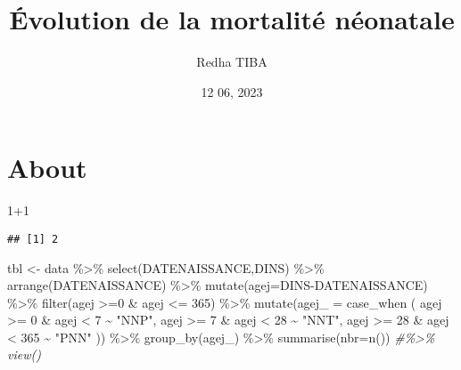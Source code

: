 \documentclass[
]{book}
\title{Évolution de la mortalité néonatale}
\author{Redha TIBA}
\date{12 06, 2023}
\newenvironment{Shaded}{\begin{snugshade}}{\end{snugshade}}
\newcommand{\AttributeTok}[1]{\textcolor[rgb]{0.77,0.63,0.00}{#1}}
\newcommand{\CommentTok}[1]{\textcolor[rgb]{0.56,0.35,0.01}{\textit{#1}}}
\newcommand{\DecValTok}[1]{\textcolor[rgb]{0.00,0.00,0.81}{#1}}
\newcommand{\FunctionTok}[1]{\textcolor[rgb]{0.00,0.00,0.00}{#1}}
\newcommand{\NormalTok}[1]{#1}
\newcommand{\OtherTok}[1]{\textcolor[rgb]{0.56,0.35,0.01}{#1}}
\newcommand{\SpecialCharTok}[1]{\textcolor[rgb]{0.00,0.00,0.00}{#1}}
\newcommand{\StringTok}[1]{\textcolor[rgb]{0.31,0.60,0.02}{#1}}
\begin{document}
\maketitle

{
\setcounter{tocdepth}{1}
\tableofcontents
}
\hypertarget{about}{%
\chapter{About}\label{about}}

\begin{Shaded}
\begin{Highlighting}[]
\DecValTok{1}\SpecialCharTok{+}\DecValTok{1}
\end{Highlighting}
\end{Shaded}

\begin{verbatim}
## [1] 2
\end{verbatim}

\begin{Shaded}
\begin{Highlighting}[]
\NormalTok{tbl }\OtherTok{\textless{}{-}}\NormalTok{ data }\SpecialCharTok{\%\textgreater{}\%}
  \FunctionTok{select}\NormalTok{(DATENAISSANCE,DINS) }\SpecialCharTok{\%\textgreater{}\%} 
  \FunctionTok{arrange}\NormalTok{(DATENAISSANCE) }\SpecialCharTok{\%\textgreater{}\%} 
  \FunctionTok{mutate}\NormalTok{(}\AttributeTok{agej=}\NormalTok{DINS}\SpecialCharTok{{-}}\NormalTok{DATENAISSANCE) }\SpecialCharTok{\%\textgreater{}\%} 
  \FunctionTok{filter}\NormalTok{(agej }\SpecialCharTok{\textgreater{}=}\DecValTok{0} \SpecialCharTok{\&}\NormalTok{ agej }\SpecialCharTok{\textless{}=} \DecValTok{365}\NormalTok{) }\SpecialCharTok{\%\textgreater{}\%} 
  \FunctionTok{mutate}\NormalTok{(}\AttributeTok{agej\_ =}
\NormalTok{           case\_when}
\NormalTok{            (}
\NormalTok{             agej }\SpecialCharTok{\textgreater{}=} \DecValTok{0} \SpecialCharTok{\&}\NormalTok{ agej }\SpecialCharTok{\textless{}} \DecValTok{7} \SpecialCharTok{\textasciitilde{}} \StringTok{"NNP"}\NormalTok{,}
\NormalTok{             agej }\SpecialCharTok{\textgreater{}=} \DecValTok{7} \SpecialCharTok{\&}\NormalTok{ agej }\SpecialCharTok{\textless{}} \DecValTok{28} \SpecialCharTok{\textasciitilde{}} \StringTok{"NNT"}\NormalTok{,}
\NormalTok{             agej }\SpecialCharTok{\textgreater{}=} \DecValTok{28} \SpecialCharTok{\&}\NormalTok{ agej }\SpecialCharTok{\textless{}} \DecValTok{365} \SpecialCharTok{\textasciitilde{}} \StringTok{"PNN"}
\NormalTok{             )) }\SpecialCharTok{\%\textgreater{}\%} 
  \FunctionTok{group\_by}\NormalTok{(agej\_) }\SpecialCharTok{\%\textgreater{}\%} 
  \FunctionTok{summarise}\NormalTok{(}\AttributeTok{nbr=}\FunctionTok{n}\NormalTok{()) }\CommentTok{\#\%\textgreater{}\% view()}
\end{Highlighting}
\end{Shaded}
\end{document}
